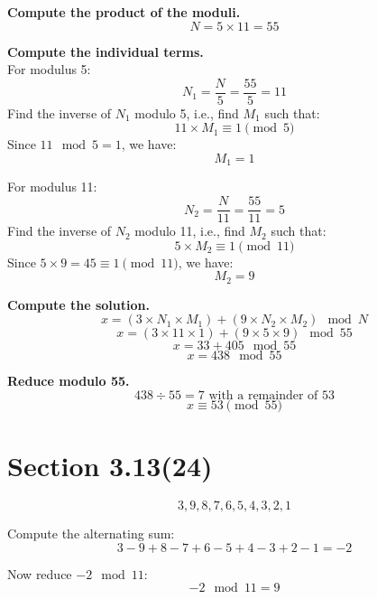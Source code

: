 \documentclass[12pt]{article}
\begin{document}
\textbf{Compute the product of the moduli.} \\
\[
N = 5 \times 11 = 55
\]

\textbf{Compute the individual terms.} \\
For modulus 5:
\[
N_1 = \frac{N}{5} = \frac{55}{5} = 11
\]
Find the inverse of \( N_1 \) modulo 5, i.e., find \( M_1 \) such that:
\[
11 \times M_1 \equiv 1 \pmod{5}
\]
Since \( 11 \mod 5 = 1 \), we have:
\[
M_1 = 1
\]

For modulus 11:
\[
N_2 = \frac{N}{11} = \frac{55}{11} = 5
\]
Find the inverse of \( N_2 \) modulo 11, i.e., find \( M_2 \) such that:
\[
5 \times M_2 \equiv 1 \pmod{11}
\]
Since \( 5 \times 9 = 45 \equiv 1 \pmod{11} \), we have:
\[
M_2 = 9
\]

\textbf{Compute the solution.} \\
\[
x = (3 \times N_1 \times M_1) + (9 \times N_2 \times M_2) \mod N
\]
\[
x = (3 \times 11 \times 1) + (9 \times 5 \times 9) \mod 55
\]
\[
x = 33 + 405 \mod 55
\]
\[
x = 438 \mod 55
\]

\textbf{Reduce modulo 55.} \\
\[
438 \div 55 = 7 \text{ with a remainder of } 53
\]
\[
x \equiv 53 \pmod{55}
\]



\newpage


\section*{Section 3.13(24)}
\[
3, 9, 8, 7, 6, 5, 4, 3, 2, 1
\]

Compute the alternating sum:
\[
3 - 9 + 8 - 7 + 6 - 5 + 4 - 3 + 2 - 1 = -2
\]

Now reduce \( -2 \mod 11 \):
\[
-2 \mod 11 = 9
\]
\end{document}
